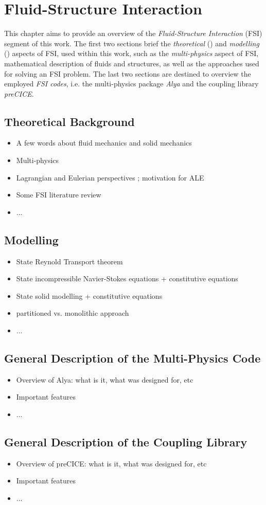 \chapter{Fluid-Structure Interaction}
\label{chapter:Fluid-Structure Interaction}
	This chapter aims to provide an overview of the \emph{Fluid-Structure Interaction} (FSI) segment of this work. The first two sections brief the \emph{theoretical} () and \emph{modelling} () aspects of FSI, used within this work, such as the \emph{multi-physics} aspect of FSI, mathematical description of fluids and structures, as well as the approaches used for solving an FSI problem. The last two sections are destined to overview the employed \emph{FSI codes}, i.e. the multi-physics package \emph{Alya} and the coupling library \emph{preCICE}.
\section{Theoretical Background}
\label{sec:Theoretical Background}
\begin{itemize}
\item A few words about fluid mechanics and solid mechanics
\item Multi-physics
\item Lagrangian and Eulerian perspectives ; motivation for ALE
\item Some FSI literature review
\item ...
\end{itemize}
\section{Modelling}
\label{sec:Modelling}
\begin{itemize}
\item State Reynold Transport theorem
\item State incompressible Navier-Stokes equations + constitutive equations 
\item State solid modelling + constitutive equations
\item partitioned vs. monolithic approach
\item ...
\end{itemize}	
\section{General Description of the Multi-Physics Code}
\label{sec:General Description of the Multi-Physics Code}
\begin{itemize}
\item Overview of Alya: what is it, what was designed for, etc
\item Important features
\item ...
\end{itemize}		
\section{General Description of the Coupling Library}
\label{sec:General Description of the Coupling Library}
\begin{itemize}
\item Overview of preCICE: what is it, what was designed for, etc
\item Important features
\item ...
\end{itemize}	
